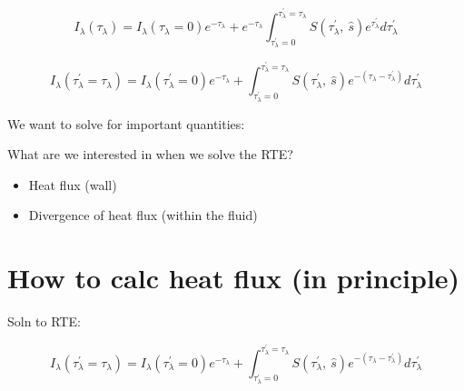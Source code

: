 \documentclass[12pt]{article}
\renewcommand{\_}{\kern-1.5pt\textunderscore\kern-1.5pt}
\begin{document}
 \[ I_{ \lambda } \left(  \tau_{ \lambda } \right) =I_{ \lambda } \left(  \tau_{ \lambda }=0 \right) e^{- \tau_{ \lambda }}+e^{- \tau_{ \lambda }} \int _{ \tau_{ \lambda }^{'}=0}^{ \tau_{ \lambda }^{'}= \tau_{ \lambda }}S \left(  \tau_{ \lambda }^{'},~\hat{s} \right) e^{ \tau_{ \lambda }^{'}}d \tau_{ \lambda }^{'} \] \par

 \[ I_{ \lambda } \left(  \tau_{ \lambda }^{'}= \tau_{ \lambda } \right) =I_{ \lambda } \left(  \tau_{ \lambda }^{'}=0 \right) e^{- \tau_{ \lambda }}+ \int _{ \tau_{ \lambda }^{'}=0}^{ \tau_{ \lambda }^{'}= \tau_{ \lambda }}S \left(  \tau_{ \lambda }^{'},~\hat{s} \right) e^{- \left(  \tau_{ \lambda }- \tau_{ \lambda }^{'} \right) }d \tau_{ \lambda }^{'} \] \par

\par

We want to solve for important quantities:\par

What are we interested in when we solve the RTE?\par


\vspace{\baselineskip}
\par

\begin{itemize}
	\item Heat flux (wall)\par

	\item Divergence of heat flux (within the fluid)\par


\vspace{\baselineskip}

\end{itemize}\section*{How to calc heat flux (in principle)}
Soln to RTE:\par

 \[ I_{ \lambda } \left(  \tau_{ \lambda }^{'}= \tau_{ \lambda } \right) =I_{ \lambda } \left(  \tau_{ \lambda }^{'}=0 \right) e^{- \tau_{ \lambda }}+ \int _{ \tau_{ \lambda }^{'}=0}^{ \tau_{ \lambda }^{'}= \tau_{ \lambda }}S \left(  \tau_{ \lambda }^{'},~\hat{s} \right) e^{- \left(  \tau_{ \lambda }- \tau_{ \lambda }^{'} \right) }d \tau_{ \lambda }^{'} \] \par
\end{document}
